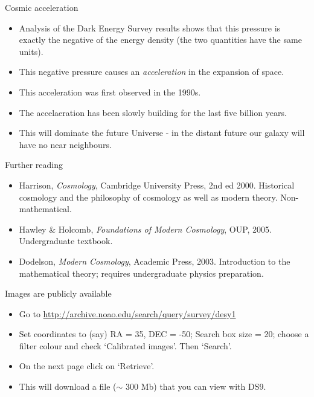 \documentclass[usenames,dvipsnames]{beamer}
\begin{document}
\begin{frame}{Cosmic acceleration}
  \begin{block}{}
    \begin{itemize}
      \item{Analysis of the Dark Energy Survey results shows that this pressure is exactly the negative of the energy density (the two quantities have the same units).}
      \item{This negative pressure causes an \textit{acceleration} in the expansion of space.}
      \item{This acceleration was first observed in the 1990s.}
      \item{The accelaeration has been slowly building for the last five billion years.}
      \item{This will dominate the future Universe - in the distant future our galaxy will have no near neighbours.}
    \end{itemize}
  \end{block}
\end{frame}

\begin{frame}{Further reading}
  \begin{block}{}
    \begin{itemize}
      \item{Harrison, \textit{Cosmology}, Cambridge University Press, 2nd ed 2000. Historical cosmology and the philosophy of cosmology as well as modern theory. Non-mathematical.}
      \item{Hawley \& Holcomb, \textit{Foundations of Modern Cosmology}, OUP, 2005. Undergraduate textbook.}
      \item{Dodelson, \textit{Modern Cosmology}, Academic Press, 2003. Introduction to the mathematical theory; requires undergraduate physics preparation.}
    \end{itemize}
  \end{block}
\end{frame}


\begin{frame}{Images are publicly available}
  \begin{block}{}
    \begin{itemize}
      \item{Go to \url{http://archive.noao.edu/search/query/survey/desy1}}
      \item{Set coordinates to (say) RA = 35, DEC = -50; Search box size = 20; choose a filter colour and check `Calibrated images'. Then `Search'.}
      \item{On the next page click on `Retrieve'.}
      \item{This will download a file ($\sim$ 300 Mb) that you can view with DS9.}
    \end{itemize}
  \end{block}
\end{frame}
\end{document}
